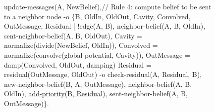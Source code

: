 \begin{figure}[h!]
\begin{LineCode}[commandchars=\\\{\}]
update-messages(A, NewBelief),\hfill// Rule 4: compute belief to be sent to a neighbor node
   -o \{B, OldIn, OldOut, Cavity, Convolved, OutMessage, Residual |
         !edge(A, B),
         neighbor-belief(A, B, OldIn),
         sent-neighbor-belief(A, B, OldOut),
         Cavity = normalize(divide(NewBelief, OldIn)),
         Convolved = normalize(convolve(global-potential, Cavity)),
         OutMessage = damp(Convolved, OldOut, damping)
         Residual = residual(OutMessage, OldOut)
         -o check-residual(A, Residual, B),
            new-neighbor-belief(B, A, OutMessage),
            neighbor-belief(A, B, OldIn),
            \underline{add-priority(B, Residual)},
            sent-neighbor-belief(A, B, OutMessage)\}.
\end{LineCode}
\label{code:coordination:improved_bp}
\end{figure}
